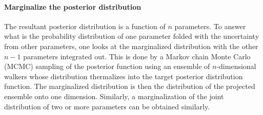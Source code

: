 \paragraph{Marginalize the posterior distribution} The resultant posterior distribution is a function of $n$ parameters.
To answer what is the probability distribution of one parameter folded with the uncertainty from other parameters, one looks at the marginalized distribution with the other $n-1$ parameters integrated out.
This is done by a Markov chain Monte Carlo (MCMC) sampling of the posterior function using an ensemble of $n$-dimensional walkers whose distribution thermalizes into the target posterior distribution function.
The marginalized distribution is then the distribution of the projected ensemble onto one dimension.
Similarly, a marginalization of the joint distribution of two or more parameters can be obtained similarly.



